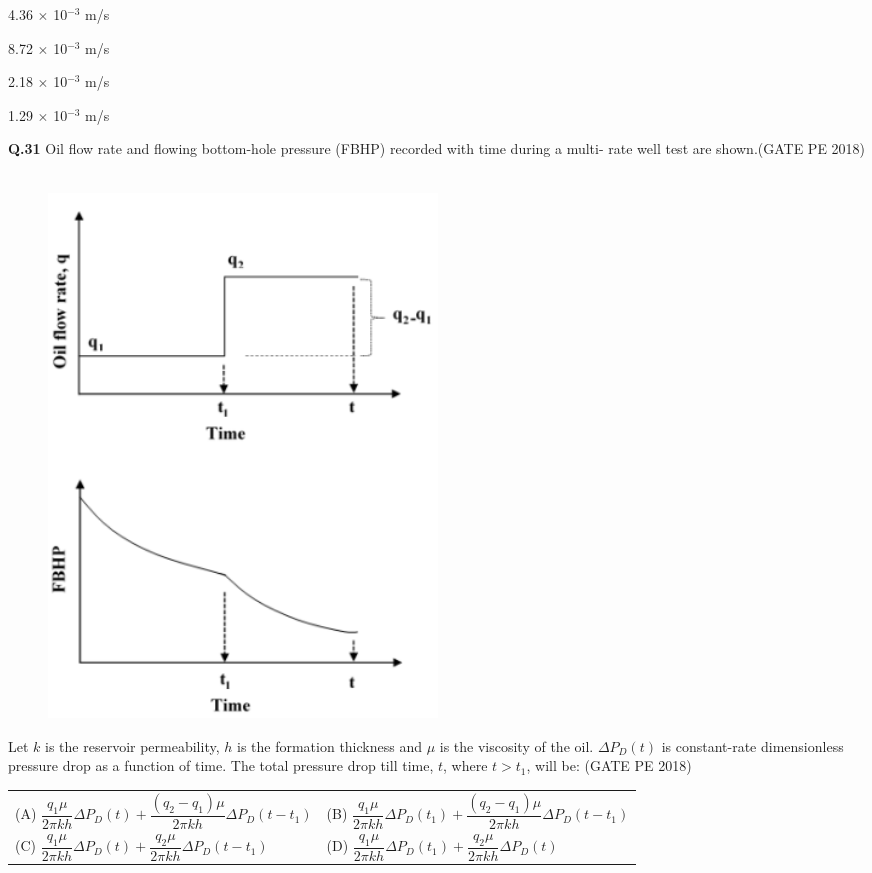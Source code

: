 \documentclass[12pt,a4paper]{article}
\begin{document}
\vspace{0.3cm}

\begin{enumerate}[label=(\Alph*)] 
\begin{multicols}{2}

\item 4.36 $\times$ 10$^{-3}$ m/s \item 8.72 $\times$ 10$^{-3}$ m/s 
\item 2.18 $\times$ 10$^{-3}$ m/s \item 1.29 $\times$ 10$^{-3}$ m/s 
\end{multicols}
\end{enumerate}
\pagebreak
\noindent
\textbf{Q.31} Oil flow rate and flowing bottom-hole pressure (FBHP) recorded with time during a multi-
rate well test are shown.\hfill(GATE PE 2018)\\\\

\begin{figure}[h!]
  \centering
  \includegraphics[width=0.5\textwidth]{pic10.png} 
\end{figure}



Let $k$ is the reservoir permeability, $h$ is the formation thickness and $\mu$ is the viscosity of the oil. $\Delta P_D(t)$ is constant-rate dimensionless pressure drop as a function of time. The total pressure drop till time, $t$, where $t > t_1$, will be: \hfill (GATE PE 2018)

\vspace{0.3cm}
\begin{tabular}{ll}
(A) $\dfrac{q_1 \mu}{2 \pi k h} \Delta P_D(t) + \dfrac{(q_2 - q_1) \mu}{2 \pi k h} \Delta P_D(t - t_1)$ 
&
(B) $\dfrac{q_1 \mu}{2 \pi k h} \Delta P_D(t_1) + \dfrac{(q_2 - q_1) \mu}{2 \pi k h} \Delta P_D(t - t_1)$
\\[1.5ex]
(C) $\dfrac{q_1 \mu}{2 \pi k h} \Delta P_D(t) + \dfrac{q_2 \mu}{2 \pi k h} \Delta P_D(t - t_1)$
&
(D) $\dfrac{q_1 \mu}{2 \pi k h} \Delta P_D(t_1) + \dfrac{q_2 \mu}{2 \pi k h} \Delta P_D(t)$
\end{tabular}
\end{document}
